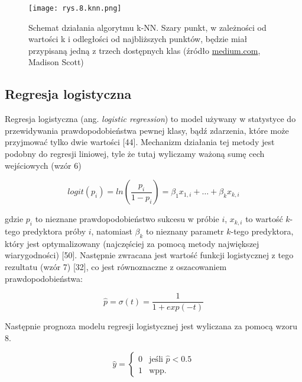 \begin{figure}[h]
    \centering
    \texttt{[image: rys.8.knn.png]}
    \caption{Schemat działania algorytmu k-NN. Szary punkt, w zależności od wartości k i odległości od najbliższych punktów, będzie miał przypisaną jedną z trzech dostępnych klas (źródło \protect\href{https://medium.com/capital-one-tech/k-nearest-neighbors-knn-algorithm-for-machine-learning-e883219c8f26}{medium.com}, Madison Scott)}
    \label{fig:mesh8}
\end{figure}


\subsection{Regresja logistyczna}
\label{Regresja logistyczna}

Regresja logistyczna (ang. \textit{logistic regression}) to model używany w statystyce do przewidywania prawdopodobieństwa pewnej klasy, bądź zdarzenia, które może przyjmować tylko dwie wartości [44]. Mechanizm działania tej metody jest podobny do regresji liniowej, tyle że tutaj wyliczamy ważoną sumę cech wejściowych (wzór 6)

\begin{equation}
logit(p_{i}) = ln( \frac {p_{i}} {1-p_{i}}) = \beta_{1}x_{1, i}+\dots+\beta_{k}x_{k, i}
\end{equation}

\noindent gdzie $p_i$ to nieznane prawdopodobieństwo sukcesu w próbie $i$, $x_{k,i}$ to wartość $k$-tego predyktora próby $i$, natomiast $\beta_k$ to nieznany parametr $k$-tego predyktora, który jest optymalizowany (najczęściej za pomocą metody największej wiarygodności) [50]. Następnie zwracana jest wartość funkcji logistycznej z tego rezultatu (wzór 7) [32], co jest równoznaczne z oszacowaniem prawdopodobieństwa: 

\begin{equation}
	\hat p = \sigma(t)=\frac {1} {1+exp(-t)}
\end{equation}

\noindent Następnie prognoza modelu regresji logistycznej jest wyliczana za pomocą wzoru 8.

\begin{equation}
\hat {y} =
	\begin{cases}
	      0 & \text{jeśli $\hat {p} < 0.5$}\\
	      1 & \text{wpp.}
	\end{cases}       
\end{equation}


